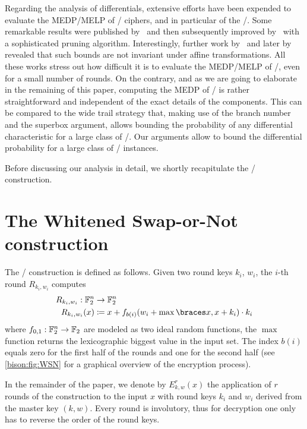 Regarding the analysis of differentials, extensive efforts have been expended to evaluate the MEDP/MELP of \SPN/ ciphers, and in particular of the \AES/.
Some remarkable results were published by~\cite{FSE:PSLL03} and then subsequently improved by~\cite{IETIS:KelSui07} with a sophisticated pruning algorithm.
Interestingly, further work by~\cite{SCN:DaeRij06} and later by~\cite{EC:CanRou15} revealed that such bounds are not invariant under affine transformations.
All these works stress out how difficult it is to evaluate the MEDP/MELP of \SPNp/, even for a small number of rounds.
On the contrary, and as we are going to elaborate in the remaining of this paper, computing the MEDP of \bison/ is rather straightforward and independent of the exact details of the components.
This can be compared to the wide trail strategy that, making use of the branch number and the superbox argument, allows bounding the probability of any differential characteristic for a large class of \SPNp/.
Our arguments allow to bound the differential probability for a large class of \WSN/ instances.

Before discussing our analysis in detail, we shortly recapitulate the \WSN/ construction.

\section{The Whitened Swap-or-Not construction}\label{sec:bison:wsn}

The \WSN/ construction is defined as follows.
Given two round keys $k_i$, $w_i$, the $i$-th round $R_{k_i,w_i}$ computes
\begin{align*}
    R_{k_i,w_i} : \F_2^n &\to \F_2^n \\
    R_{k_i,w_i}(x) &\coloneqq x + f_{b(i)}(w_i + \max\set{x, x + k_i}) \cdot k_i
\end{align*}
where $f_{0,1} : \mathbb{F}_2^n \to \mathbb{F}_2$ are modeled as two ideal random functions, the $\max$ function returns the lexicographic biggest value in the input set.
The index $b(i)$ equals zero for the first half of the rounds and one for the second half (see \cref{bison:fig:WSN} for a graphical overview of the encryption process).

In the remainder of the paper, we denote by $E_{k,w}^r(x)$ the application of $r$ rounds of the construction to the input $x$ with round keys $k_i$ and $w_i$ derived from the master key $(k,w)$.
Every round is involutory, thus for decryption one only has to reverse the order of the round keys.

